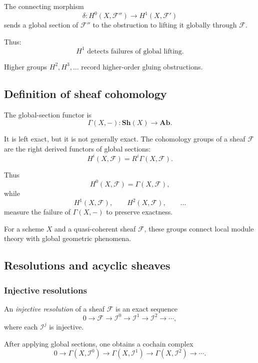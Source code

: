 \documentclass[12pt,a4paper]{article}
\theoremstyle{notespace}
\begin{document}
The connecting morphism
\[
\delta:
H^{0}(X,\mathcal{F}'')
\longrightarrow
H^{1}(X,\mathcal{F}')
\]
sends a global section of \(\mathcal{F}''\) to the obstruction to lifting it
globally through \(\mathcal{F}\).

Thus:
\[
\boxed{
	H^{1}
	\text{ detects failures of global lifting.}
}
\]

Higher groups \(H^{2},H^{3},\ldots\) record higher-order gluing
obstructions.

\subsection{Definition of sheaf cohomology}

The global-section functor is
\[
\Gamma(X,-):
\mathbf{Sh}(X)
\longrightarrow
\mathbf{Ab}.
\]

It is left exact, but it is not generally exact. The cohomology groups of a
sheaf \(\mathcal{F}\) are the right derived functors of global sections:
\[
H^{i}(X,\mathcal{F})
=
R^{i}\Gamma(X,\mathcal{F}).
\]

Thus
\[
H^{0}(X,\mathcal{F})
=
\Gamma(X,\mathcal{F}),
\]
while
\[
H^{1}(X,\mathcal{F}),
\qquad
H^{2}(X,\mathcal{F}),
\qquad
\ldots
\]
measure the failure of \(\Gamma(X,-)\) to preserve exactness.

For a scheme \(X\) and a quasi-coherent sheaf \(\mathcal{F}\), these groups
connect local module theory with global geometric phenomena.

\subsection{Resolutions and acyclic sheaves}

\subsubsection{Injective resolutions}

An \emph{injective resolution} of a sheaf \(\mathcal{F}\) is an exact
sequence
\[
0
\longrightarrow
\mathcal{F}
\longrightarrow
\mathcal{I}^{0}
\longrightarrow
\mathcal{I}^{1}
\longrightarrow
\mathcal{I}^{2}
\longrightarrow
\cdots,
\]
where each \(\mathcal{I}^{j}\) is injective.

After applying global sections, one obtains a cochain complex
\[
0
\longrightarrow
\Gamma(X,\mathcal{I}^{0})
\longrightarrow
\Gamma(X,\mathcal{I}^{1})
\longrightarrow
\Gamma(X,\mathcal{I}^{2})
\longrightarrow
\cdots.
\]
\end{document}
